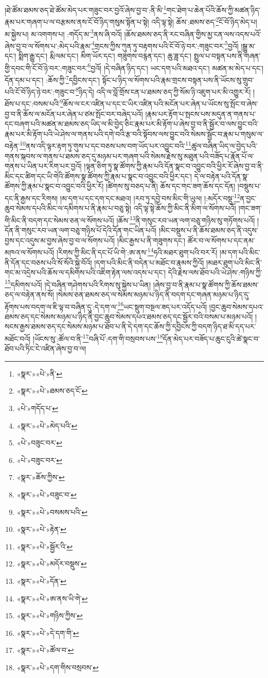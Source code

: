 །ཐེ་ཚོམ་ཐམས་ཅད་ཐེ་ཚོམ་མེད་པར་གཟུང་བར་བྱའོ་ཞེས་བྱ་བ་:ནི་མི་\footnote{«སྣར་»«པེ་»ནི་}གང་ཐེག་པ་ཆེན་པོའི་ཆོས་ཀྱི་མཚན་ཉིད་རྣམ་པར་གཞག་པ་ལ་བརྩམས་ནས་ངོ་བོ་ཉིད་གསུམ་སྟོན་པ་སྟེ། འདི་ལྟ་སྟེ། ཆོས་:ཐམས་ཅད་\footnote{«སྣར་»«པེ་»ཐམས་ཅད་ངོ་}ངོ་བོ་ཉིད་མེད་པ། མ་སྐྱེས་པ། མ་འགགས་པ། :གདོད་མ་\footnote{«པེ་»གདོད་པ་}ནས་ཞི་བའོ། །ཆོས་ཐམས་ཅད་ནི་རང་བཞིན་གྱིས་མྱ་ངན་ལས་འདས་པའོ་ཞེས་བྱ་བ་ལ་སོགས་པ་:མེད་པའི་རྣམ་\footnote{«སྣར་»«པེ་»མེད་པའི་}གྲངས་ཀྱིས་ཀུན་ཏུ་བརྟགས་པའི་ངོ་བོ་ཉེ་བར་:གཟུང་བར་\footnote{«པེ་»བཟུང་བར་}བྱའོ། །སྒྱུ་མ་དང་། སྨིག་རྒྱུ་དང་། རྨི་ལམ་དང་། མིག་ཡོར་དང་། གཟུགས་བརྙན་དང་། ཆུ་ཟླ་དང་། སྤྲུལ་པ་བསྟན་པས་ནི་གཞན་གྱི་དབང་གི་ངོ་བོ་ཉེ་བར་:གཟུང་བར་\footnote{«པེ་»བཟུང་བར་}བྱའོ། །དེ་བཞིན་ཉིད་དང་། ཡང་དག་པའི་མཐའ་དང་། མཚན་མ་མེད་པ་དང་། དོན་དམ་པ་དང་། :ཆོས་ཀྱི་\footnote{«སྣར་»ཆོས་ཀྱིས་}དབྱིངས་དང་། སྟོང་པ་ཉིད་ལ་སོགས་པའི་རྣམ་གྲངས་བསྟན་པས་ནི་ཡོངས་སུ་གྲུབ་པའི་ངོ་བོ་ཉིད་ཉེ་བར་:གཟུང་བ་\footnote{«སྣར་»«པེ་»བཟུང་བ་}ཉིད་དེ། འདི་ལ་བློ་གྲོས་ངན་པ་ཐམས་ཅད་ཀྱི་སོམ་ཉི་འཇུག་པར་མི་འགྱུར་རོ། །ཐོས་པ་དང་:བསམ་པའི་\footnote{«སྣར་»«པེ་»བསམས་པའི་}ཆོས་ལ་ངར་འཛིན་པ་དང་ང་ཡིར་འཛིན་པའི་མངོན་པར་ཞེན་པ་ཡོངས་སུ་སྤོང་བ་ཞེས་བྱ་བ་ནི་ཆོས་ལ་མངོན་པར་ཞེན་པ་ཙམ་སྤོང་བར་བཞེད་པའོ། །རྣམ་པར་རྟོག་པ་སྤངས་པས་མདུན་ན་གནས་པ་དང་བཞག་པའི་མཚན་མ་ཐམས་ཅད་ཡིད་ལ་མི་བྱེད་ཅིང་རྣམ་པར་མི་རྟོག་པ་ཞེས་བྱ་བ་ནི་སྦྱོར་བ་ལས་བྱུང་བའི་རྣམ་པར་མི་རྟོག་པའི་ཡེ་ཤེས་ལ་གནས་པའི་དགེ་བའི་རྩ་བའི་སྟོབས་ལས་བྱུང་བའི་སེམས་སྦྱོང་བ་རྣམ་པ་གསུམ་ལ་བརྟེན་\footnote{«སྣར་»«པེ་»རྟེན་}ནས་འདི་ལྟར་རྟག་ཏུ་གུས་པ་དང་བཅས་པས་བག་ཡོད་པར་འབྱུང་བའི་\footnote{«སྣར་»«པེ་»སྦྱོར་འི་}ཚུལ་བཞིན་ཡིད་ལ་བྱེད་པའི་གནས་སྐབས་ལ་གནས་པ་ཐམས་ཅད་དུ་མཉམ་པར་གཞག་པའི་སེམས་རྗེས་སུ་མཐུན་པའི་བཟོད་པ་རྣོན་པོ་ལ་གནས་པ་ཡིན་པར་རིག་པར་བྱའོ། །ལྟན་ཅིག་ཏུ་སྣ་ཚོགས་ཀྱི་རྣམ་པའི་དོན་སྣང་བ་འབྱུང་བའི་ཕྱིར་རོ་ཞེས་བྱ་བ་ནི་མིང་དང་ཚིག་དང་ཡི་གེའི་ཚོགས་སྣ་ཚོགས་ཀྱི་རྣམ་པ་སྣང་བ་འབྱུང་བའི་ཕྱིར་དང་། དེ་ལ་བརྟེན་པའི་དོན་སྣ་ཚོགས་ཀྱི་རྣམ་པ་སྣང་བ་འབྱུང་བའི་ཕྱིར་རོ། །ཚིགས་སུ་བཅད་པ་ནི། ཆོས་དང་གང་ཟག་ཆོས་དང་དོན། །བསྡུས་པ་དང་ནི་རྒྱས་དང་རིགས། །མ་དག་པ་དང་དག་དང་མཐའ། །རབ་ཏུ་དབྱེ་བས་མིང་གི་ཡུལ། །:མདོར་བསྡུ་\footnote{«སྣར་»«པེ་»མདོར་བསྡུས་}ན་བྱང་ཆུབ་སེམས་དཔའི་མིང་ལ་དམིགས་པ་ནི་རྣམ་པ་བཅུ་སྟེ། འདི་ལྟ་སྟེ་ཆོས་ཀྱི་མིང་ནི་མིག་ལ་སོགས་པའོ། །གང་ཟག་གི་མིང་ནི་བདག་དང་སེམས་ཅན་ལ་སོགས་པའོ། །ཆོས་\footnote{«སྣར་»«པེ་»དོན་}ནི་གསུང་རབ་ཡན་ལག་བཅུ་གཉིས་སུ་གཏོགས་པའོ། །དོན་ནི་གསུང་རབ་ཡན་ལག་བཅུ་གཉིས་པོ་དེའི་དོན་གང་ཡིན་པའོ། །མིང་བསྡུས་པ་ནི་ཆོས་ཐམས་ཅད་ནི་འདུས་བྱས་དང་འདུས་མ་བྱས་ཞེས་བྱ་བ་ལ་སོགས་པའོ། །མིང་རྒྱས་པ་ནི་གཟུགས་དང་། ཚོར་བ་ལ་སོགས་པ་དང་ནམ་མཁའ་ལ་སོགས་པའོ། །རིགས་ཀྱི་མིང་ནི་དང་པོ་ཡི་གེ་:ཨ་ནས་\footnote{«སྣར་»«པེ་»ཨ་ནས་ཡི་གེ་}ཧའི་མཐར་ཐུག་པའི་བར་རོ། །མ་དག་པའི་མིང་ནི་དོན་དང་བཅས་པའི་སོ་སོའི་སྐྱེ་བོའོ། །དག་པའི་མིང་ནི་བདེན་པ་མཐོང་བ་རྣམས་ཀྱིའོ། །མཐར་ཐུག་པའི་མིང་ནི་གང་མ་འདྲེས་པའི་ཆོས་ལ་དམིགས་པའི་འཇིག་རྟེན་ལས་འདས་པ་དང་། དེའི་རྗེས་ལས་ཐོབ་པའི་ཡེ་ཤེས་:གཉིས་ཀྱི་\footnote{«སྣར་»«པེ་»གཉིས་ཀྱིས་}དམིགས་པའོ། །དེ་བཞིན་གཤེགས་པའི་རིགས་སུ་སྐྱེས་པ་ཡིན། །ཞེས་བྱ་བ་ནི་རྣམ་པ་སྣ་ཚོགས་ཀྱི་ཆོས་ཐམས་ཅད་ལ་བརྟེན་ནས་སོ། །སེམས་ཅན་ཐམས་ཅད་ལ་སེམས་མཉམ་པ་ཉིད་ནི་བདག་དང་གཞན་མཉམ་པ་ཉིད་དུ་རྟོགས་པས་བདག་ལ་ཇི་ལྟ་བ་བཞིན་དུ་:དེ་དག་ལ་\footnote{«སྣར་»«པེ་»དེ་དག་གི་}ཡང་སྡུག་བསྔལ་ཟད་པར་འདོད་པའོ། །བྱང་ཆུབ་སེམས་དཔའ་ཐམས་ཅད་དང་སེམས་མཉམ་པ་ཉིད་ནི་བྱང་ཆུབ་སེམས་དཔའ་ཐམས་ཅད་དང་སྦྱོར་བའི་བསམ་པ་མཉམ་པའོ། །སངས་རྒྱས་ཐམས་ཅད་དང་སེམས་མཉམ་པ་ཐོབ་པ་ནི་དེ་དག་དང་ཆོས་ཀྱི་དབྱིངས་ཀྱི་བདག་ཉིད་ཐ་མི་དད་པར་མཐོང་བའོ། །ཡོངས་སུ་:ཚོལ་བ་ནི་\footnote{«སྣར་»«པེ་»ཚོལ་བ་}བཞི་པོ་:དག་གི་བསྲབས་པས་\footnote{«སྣར་»«པེ་»དག་གིས་བསྲབས་}དོན་མེད་པར་བཟོད་པ་ཆུང་ངུའི་ཚེ་སྣང་བ་ཐོབ་པའི་ཏིང་ངེ་འཛིན་ཞེས་བྱ་བ་ལ། 